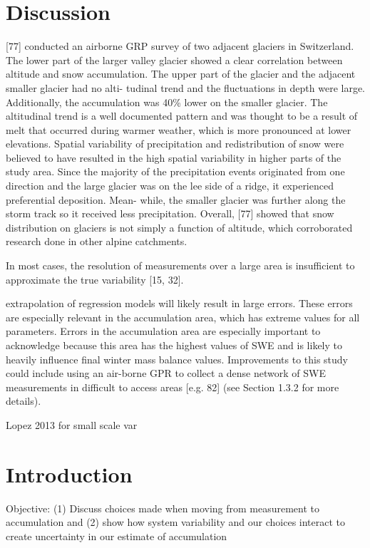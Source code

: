 \documentclass[twocolumn,letterpaper]{igs}
\begin{document}
\section{Discussion}
[77] conducted an airborne GRP survey of two adjacent glaciers in Switzerland. The
lower part of the larger valley glacier showed a clear correlation between altitude and snow
accumulation. The upper part of the glacier and the adjacent smaller glacier had no alti-
tudinal trend and the fluctuations in depth were large. Additionally, the accumulation was
40\% lower on the smaller glacier. The altitudinal trend is a well documented pattern and
was thought to be a result of melt that occurred during warmer weather, which is more
pronounced at lower elevations. Spatial variability of precipitation and redistribution of
snow were believed to have resulted in the high spatial variability in higher parts of the
study area. Since the majority of the precipitation events originated from one direction and
the large glacier was on the lee side of a ridge, it experienced preferential deposition. Mean-
while, the smaller glacier was further along the storm track so it received less precipitation.
Overall, [77] showed that snow distribution on glaciers is not simply a function of altitude,
which corroborated research done in other alpine catchments.

 In most cases, the resolution of measurements over a large area is insufficient to
approximate the true variability [15, 32].


extrapolation of regression models will
likely result in large errors. These errors are especially relevant in the accumulation area,
which has extreme values for all parameters. Errors in the accumulation area are especially
important to acknowledge because this area has the highest values of SWE and is likely to
heavily influence final winter mass balance values. Improvements to this study could include
using an air-borne GPR to collect a dense network of SWE measurements in difficult to
access areas [e.g. 82] (see Section 1.3.2 for more details).


Lopez 2013 for small scale var

\section{Introduction}

Objective: (1) Discuss choices made when moving from measurement to accumulation and (2) show how system variability and our choices interact to create uncertainty in our estimate of accumulation
\end{document}
